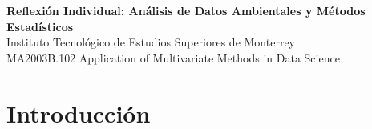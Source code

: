 \documentclass[11pt]{article}
\begin{document}
    \begin{center}
        \textbf{Reflexión Individual: Análisis de Datos Ambientales y Métodos Estadísticos} \\
        Instituto Tecnológico de Estudios Superiores de Monterrey \\
        MA2003B.102 Application of Multivariate Methods in Data Science \\
    \end{center}

    \section*{Introducción}
\end{document}
